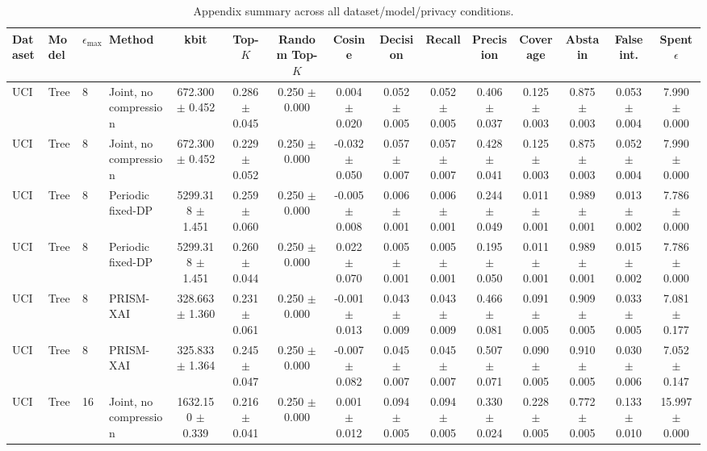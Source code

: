\begin{table}[t]
\caption{Appendix summary across all dataset/model/privacy conditions.}
\label{tab:appendix-conditions}
\centering
\scriptsize
\setlength{\tabcolsep}{2.5pt}
\begin{tabular}{llllccccccccccc}
\toprule
Dataset & Model & $\epsilon_{\max}$ & Method & kbit & Top-$K$ & Random Top-$K$ & Cosine & Decision & Recall & Precision & Coverage & Abstain & False int. & Spent $\epsilon$ \\
\midrule
UCI & Tree & 8 & Joint, no compression & 672.300 $\pm$ 0.452 & 0.286 $\pm$ 0.045 & 0.250 $\pm$ 0.000 & 0.004 $\pm$ 0.020 & 0.052 $\pm$ 0.005 & 0.052 $\pm$ 0.005 & 0.406 $\pm$ 0.037 & 0.125 $\pm$ 0.003 & 0.875 $\pm$ 0.003 & 0.053 $\pm$ 0.004 & 7.990 $\pm$ 0.000 \\
UCI & Tree & 8 & Joint, no compression & 672.300 $\pm$ 0.452 & 0.229 $\pm$ 0.052 & 0.250 $\pm$ 0.000 & -0.032 $\pm$ 0.050 & 0.057 $\pm$ 0.007 & 0.057 $\pm$ 0.007 & 0.428 $\pm$ 0.041 & 0.125 $\pm$ 0.003 & 0.875 $\pm$ 0.003 & 0.052 $\pm$ 0.004 & 7.990 $\pm$ 0.000 \\
UCI & Tree & 8 & Periodic fixed-DP & 5299.318 $\pm$ 1.451 & 0.259 $\pm$ 0.060 & 0.250 $\pm$ 0.000 & -0.005 $\pm$ 0.008 & 0.006 $\pm$ 0.001 & 0.006 $\pm$ 0.001 & 0.244 $\pm$ 0.049 & 0.011 $\pm$ 0.001 & 0.989 $\pm$ 0.001 & 0.013 $\pm$ 0.002 & 7.786 $\pm$ 0.000 \\
UCI & Tree & 8 & Periodic fixed-DP & 5299.318 $\pm$ 1.451 & 0.260 $\pm$ 0.044 & 0.250 $\pm$ 0.000 & 0.022 $\pm$ 0.070 & 0.005 $\pm$ 0.001 & 0.005 $\pm$ 0.001 & 0.195 $\pm$ 0.050 & 0.011 $\pm$ 0.001 & 0.989 $\pm$ 0.001 & 0.015 $\pm$ 0.002 & 7.786 $\pm$ 0.000 \\
UCI & Tree & 8 & PRISM-XAI & 328.663 $\pm$ 1.360 & 0.231 $\pm$ 0.061 & 0.250 $\pm$ 0.000 & -0.001 $\pm$ 0.013 & 0.043 $\pm$ 0.009 & 0.043 $\pm$ 0.009 & 0.466 $\pm$ 0.081 & 0.091 $\pm$ 0.005 & 0.909 $\pm$ 0.005 & 0.033 $\pm$ 0.005 & 7.081 $\pm$ 0.177 \\
UCI & Tree & 8 & PRISM-XAI & 325.833 $\pm$ 1.364 & 0.245 $\pm$ 0.047 & 0.250 $\pm$ 0.000 & -0.007 $\pm$ 0.082 & 0.045 $\pm$ 0.007 & 0.045 $\pm$ 0.007 & 0.507 $\pm$ 0.071 & 0.090 $\pm$ 0.005 & 0.910 $\pm$ 0.005 & 0.030 $\pm$ 0.006 & 7.052 $\pm$ 0.147 \\
UCI & Tree & 16 & Joint, no compression & 1632.150 $\pm$ 0.339 & 0.216 $\pm$ 0.041 & 0.250 $\pm$ 0.000 & 0.001 $\pm$ 0.012 & 0.094 $\pm$ 0.005 & 0.094 $\pm$ 0.005 & 0.330 $\pm$ 0.024 & 0.228 $\pm$ 0.005 & 0.772 $\pm$ 0.005 & 0.133 $\pm$ 0.010 & 15.997 $\pm$ 0.000 \\

\end{tabular}
\end{table}
